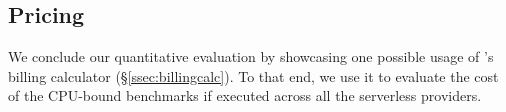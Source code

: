 \subsection{Pricing}
\label{sec:pricing}

We conclude our quantitative evaluation by showcasing one possible usage of \sys's billing calculator (\S\ref{ssec:billingcalc}).
To that end, we use it to evaluate the cost of the CPU-bound benchmarks if executed across all the serverless providers.

%
